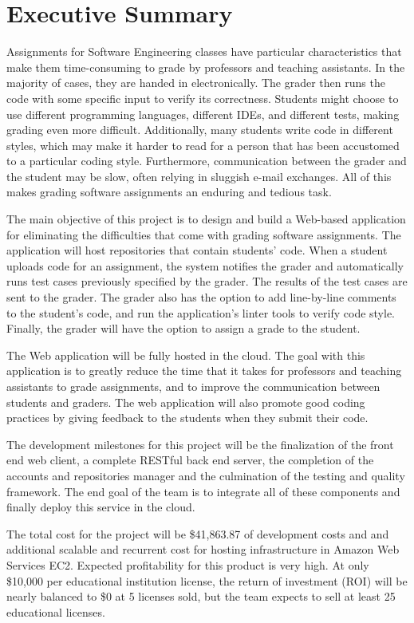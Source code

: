 \part*{Executive Summary}

Assignments for Software Engineering classes have particular characteristics
that make them time-consuming to grade by professors and teaching assistants. In
the majority of cases, they are handed in electronically. The grader then runs
the code with some specific input to verify its correctness. Students might
choose to use different programming languages, different IDEs, and different
tests, making grading even more difficult. Additionally, many students write
code in different styles, which may make it harder to read for a person that has
been accustomed to a particular coding style. Furthermore, communication between
the grader and the student may be slow, often relying in sluggish e-mail
exchanges. All of this makes grading software assignments an enduring and
tedious task.

The main objective of this project is to design and build a Web-based
application  for eliminating the difficulties that come with grading software
assignments. The application will host repositories that contain students' code.
When a student uploads code for an assignment, the system notifies the grader
and automatically runs test cases previously specified by the grader. The
results of the test cases are sent to the grader. The grader also has the option
to add line-by-line comments to the student's code, and run the application's
linter tools to verify code style. Finally, the grader will have the option to
assign a grade to the student.

The Web application will be fully hosted in the cloud. The goal with this
application is to greatly reduce the time that it takes for professors and
teaching assistants to grade assignments, and to improve the communication
between students and graders. The web application will also promote good coding
practices by giving feedback to the students when they submit their code.

The development milestones for this project will be the finalization of the
front end web client, a complete RESTful back end server, the completion of
the accounts and repositories manager and the culmination of the testing and
quality framework. The end goal of the team is to integrate all of these
components and finally deploy this service in the cloud.


The total cost for the project will be \$41,863.87 of development costs and
and additional scalable and recurrent cost for hosting infrastructure in
Amazon Web Services EC2. Expected profitability for this product is very high.
At only \$10,000 per educational institution license, the return of investment
(ROI) will be nearly balanced to \$0 at 5 licenses sold, but the team expects
to sell at least 25 educational licenses.
